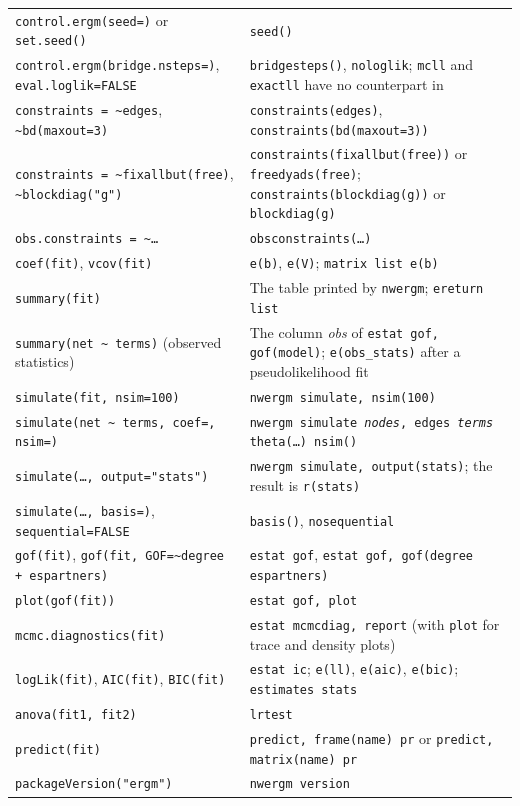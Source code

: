 \begin{longtable}{@{}>{\raggedright\arraybackslash}p{6.4cm}>{\raggedright\arraybackslash}p{9.3cm}@{}}
\texttt{control.ergm(seed=)} or \texttt{set.seed()} & \texttt{seed()}\\
\texttt{control.ergm(bridge.nsteps=)}, \texttt{eval.loglik=FALSE} & \texttt{bridgesteps()}, \texttt{nologlik}; \texttt{mcll} and \texttt{exactll} have no counterpart in \ergm{}\\
\texttt{constraints = \textasciitilde edges}, \texttt{\textasciitilde bd(maxout=3)} & \texttt{constraints(edges)}, \texttt{constraints(bd(maxout=3))}\\
\texttt{constraints = \textasciitilde fixallbut(free)}, \texttt{\textasciitilde blockdiag("g")} & \texttt{constraints(fixallbut(free))} or \texttt{freedyads(free)}; \texttt{constraints(blockdiag(g))} or \texttt{blockdiag(g)}\\
\texttt{obs.constraints = \textasciitilde \ldots} & \texttt{obsconstraints(\ldots)}\\
\texttt{coef(fit)}, \texttt{vcov(fit)} & \texttt{e(b)}, \texttt{e(V)}; \texttt{matrix list e(b)}\\
\texttt{summary(fit)} & The table printed by \texttt{nwergm}; \texttt{ereturn list}\\
\texttt{summary(net \textasciitilde{} terms)} (observed statistics) & The column \emph{obs} of \texttt{estat gof, gof(model)}; \texttt{e(obs\_stats)} after a pseudolikelihood fit\\
\texttt{simulate(fit, nsim=100)} & \texttt{nwergm simulate, nsim(100)}\\
\texttt{simulate(net \textasciitilde{} terms, coef=, nsim=)} & \texttt{nwergm simulate \emph{nodes}, edges \emph{terms} theta(\ldots) nsim()}\\
\texttt{simulate(\ldots, output="stats")} & \texttt{nwergm simulate, output(stats)}; the result is \texttt{r(stats)}\\
\texttt{simulate(\ldots, basis=)}, \texttt{sequential=FALSE} & \texttt{basis()}, \texttt{nosequential}\\
\texttt{gof(fit)}, \texttt{gof(fit, GOF=\textasciitilde degree + espartners)} & \texttt{estat gof}, \texttt{estat gof, gof(degree espartners)}\\
\texttt{plot(gof(fit))} & \texttt{estat gof, plot}\\
\texttt{mcmc.diagnostics(fit)} & \texttt{estat mcmcdiag, report} (with \texttt{plot} for trace and density plots)\\
\texttt{logLik(fit)}, \texttt{AIC(fit)}, \texttt{BIC(fit)} & \texttt{estat ic}; \texttt{e(ll)}, \texttt{e(aic)}, \texttt{e(bic)}; \texttt{estimates stats}\\
\texttt{anova(fit1, fit2)} & \texttt{lrtest}\\
\texttt{predict(fit)} & \texttt{predict, frame(name) pr} or \texttt{predict, matrix(name) pr}\\
\texttt{packageVersion("ergm")} & \texttt{nwergm version}\\
\bottomrule
\end{longtable}
\normalsize

